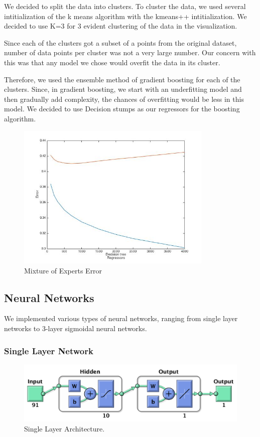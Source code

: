 \documentclass[a4paper]{article}
\begin{document}
We decided to split the data into clusters. To cluster the data, we used several intitialization of the k means algorithm with the kmeans++ intitialization. We decided to use K=3 for 3 evident clustering of the data in the visualization.

Since each of the clusters got a subset of a points from the original dataset, number of data points per cluster was not a very large number. Our concern with this was that any model we chose would overfit the data in its cluster. 

Therefore, we used the ensemble method of gradient boosting for each of the clusters. Since, in gradient boosting, we start with an underfitting model and then gradually add complexity, the chances of overfitting would be less in this model. We decided to use Decision stumps as our regressors for the boosting algorithm.

\begin{figure}[h]
\centering\includegraphics[width=1\linewidth,height=7cm]{mixtureOfExperts}
\caption{Mixture of Experts Error}
\end{figure}

\subsection{Neural Networks}
We implemented various types of neural networks, ranging from single layer networks to 3-layer sigmoidal neural networks.
\subsubsection*{Single Layer Network}

\begin{figure}[h]
\centering
\includegraphics[scale=0.50]{nnarch.png}
\caption{Single Layer Architecture.}
\end{figure}
\end{document}
